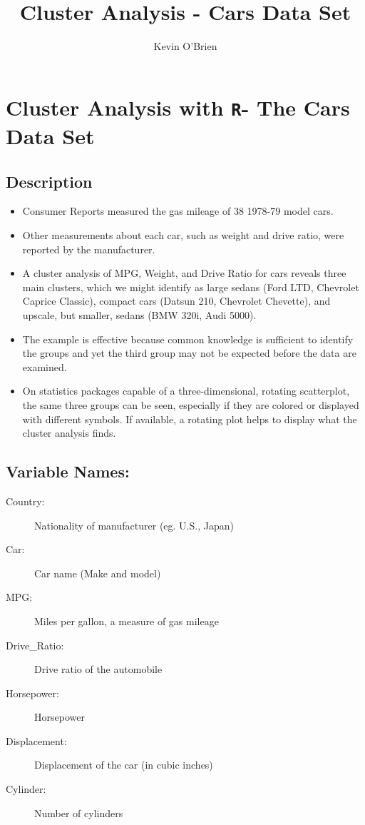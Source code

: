 \documentclass[12pt]{article}
\begin{document}
\author{Kevin O'Brien}
\title{Cluster Analysis - Cars Data Set}

\section*{Cluster Analysis with \texttt{R}- The Cars Data Set}

\subsection*{Description}
\begin{itemize}
\item Consumer Reports measured the gas mileage of 38 1978-79 model cars. 
\item Other measurements about each car, such as weight and drive ratio, were reported by the manufacturer. 
\item A cluster analysis of MPG, Weight, and Drive Ratio for cars reveals three main clusters, which we might identify as large sedans (Ford LTD, Chevrolet Caprice Classic), compact cars (Datsun 210, Chevrolet Chevette), and upscale, but smaller, sedans (BMW 320i, Audi 5000).


\item The example is effective because common knowledge is sufficient to identify the groups and yet the third group may not be expected before the data are examined.
\item
On statistics packages capable of a three-dimensional, rotating scatterplot, the same three groups can be seen, especially if they are colored or displayed with different symbols. If available, a rotating plot helps to display what the cluster analysis finds.
\end{itemize}
\subsection*{Variable Names:}
\begin{description}
\item[Country:] Nationality of manufacturer (eg. U.S., Japan)
\item[Car:] Car name (Make and model)
\item[MPG:] Miles per gallon, a measure of gas mileage
\item[Drive\_Ratio:] Drive ratio of the automobile
\item[Horsepower:] Horsepower
\item[Displacement:] Displacement of the car (in cubic inches)
\item[Cylinder:] Number of cylinders
\end{description}
\end{document}
